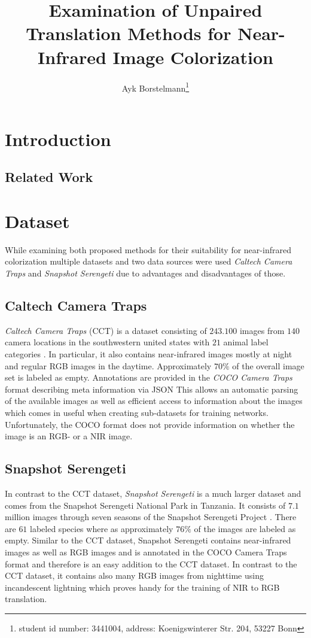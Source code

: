 \documentclass[a4paper,11pt, DIV=12]{scrartcl}
\title{Examination of Unpaired Translation Methods for Near-Infrared Image Colorization}
\author{Ayk Borstelmann\footnote{student id number: 3441004, address: Koenigswinterer Str. 204, 53227 Bonn}}
\begin{document}
\maketitle

\section{Introduction}

\subsection{Related Work}

\section{Dataset}
While examining both proposed methods for their suitability for near-infrared colorization multiple datasets 
and two data sources were used \textit{Caltech Camera Traps} and \textit{Snapshot Serengeti} due to advantages 
and disadvantages of those. 

\subsection{Caltech Camera Traps}
\textit{Caltech Camera Traps} (CCT) is a dataset consisting of $243.100$ images from $140$ camera locations 
in the southwestern united states with $21$ animal label categories \cite{caltech}. 
In particular, it also contains near-infrared images mostly at night and regular RGB images in the daytime. 
Approximately $70 \%$ of the overall image set is labeled as empty. 
Annotations are provided in the \textit{COCO Camera Traps} format describing meta information via JSON \cite{caltech}
This allows an automatic parsing of the available images as well as efficient access to information about 
the images which comes in useful when creating sub-datasets for training networks.
Unfortunately, the COCO format does not provide information on whether the image is an RGB- or a NIR image. 

\subsection{Snapshot Serengeti}
In contrast to the CCT dataset, \textit{Snapshot Serengeti} is a much larger dataset and comes from the Snapshot Serengeti National Park in Tanzania.
It consists of $7.1$ million images through seven seasons of the Snapshot Serengeti Project \cite{serengeti}. 
There are $61$ labeled species where as approximately $76\%$ of the images are labeled as empty. 
Similar to the CCT dataset, Snapshot Serengeti contains near-infrared images as well as RGB images and 
is annotated in the COCO Camera Traps format \cite{serengeti} and therefore is an easy addition to the CCT dataset.
In contrast to the CCT dataset, it contains also many RGB images from nighttime using incandescent lightning which 
proves handy for the training of NIR to RGB translation. 
\end{document}
